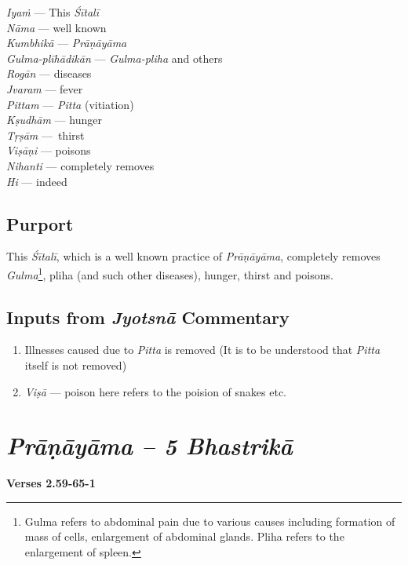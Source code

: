 \begin{multicols}{2}
\textit{Iyaṁ} --- This \textit{Śītalī} \\
\textit{Nāma} --- well known \\
\textit{Kumbhikā} --- \textit{Prāṇāyāma}\\
\textit{Gulma-plīhādikān} --- \textit{Gulma-pliha} and others \\
\textit{Rogān} --- diseases \\
\textit{Jvaram} --- fever\\
\textit{Pittam} --- \textit{Pitta} (vitiation)\\
\textit{Kṣudhām} --- hunger \\
\textit{Tṛṣām} --- thirst \\
\textit{Viṣāṇi} --- poisons\\
\textit{Nihanti} --- completely removes\\
\textit{Hi} --- indeed
\end{multicols}

\subsection*{Purport}


This \textit{Śītalī}, which is a well known practice of \textit{Prāṇāyāma}, completely removes \textit{Gulma}\footnote{Gulma refers to abdominal pain due to various causes including formation of mass of cells, enlargement of abdominal glands. Pliha refers to the enlargement of spleen.}, pliha (and such other diseases), hunger, thirst and poisons.

\subsection*{Inputs from \textit{Jyotsnā} Commentary}


\begin{enumerate}
\item Illnesses caused due to \textit{Pitta} is removed (It is to be understood that \textit{Pitta} itself is not removed)
\item \textit{Viṣā} --- poison here refers to the poision of snakes etc.
\end{enumerate}

\section*{\textit{Prāṇāyāma – 5 Bhastrikā}}

\noindent \textbf{Verses 2.59-65-1}

